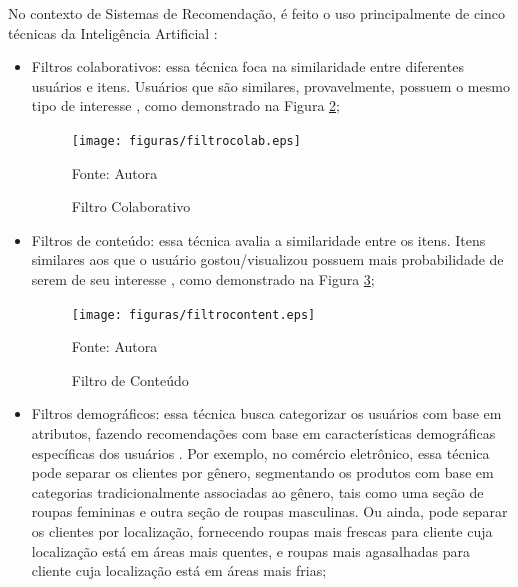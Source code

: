 No contexto de Sistemas de Recomendação, é feito o uso principalmente de cinco técnicas da Inteligência Artificial 
\cite{stratoflow-recommendation}:
\begin{itemize}
\item Filtros colaborativos: essa técnica foca na similaridade entre diferentes usuários e itens. Usuários que são
similares, provavelmente, possuem o mesmo tipo de interesse \cite{pham2019recommendation}, como demonstrado na Figura 
\hyperref[fig:filtrocolab]{2};

\begin{figure}[htbp]
    \centering
    \caption{Filtro Colaborativo}
    \label{fig:filtrocolab}
    
    \vspace{2pt} %
    
    \texttt{[image: figuras/filtrocolab.eps]}
    
    \vspace{2pt} %
    
    \small Fonte: Autora
\end{figure}

\item Filtros de conteúdo: essa técnica avalia a similaridade entre os itens. Itens similares aos que o usuário gostou/visualizou
possuem mais probabilidade de serem de seu interesse \cite{stratoflow-recommendation}, 
como demonstrado na Figura 
\hyperref[fig:filtrocont]{3};

\begin{figure}[htbp]
    \centering
    \caption{Filtro de Conteúdo}
    \label{fig:filtrocont}
    
    \vspace{2pt} %
    
    \texttt{[image: figuras/filtrocontent.eps]}
    
    \vspace{2pt} %
    
    \small Fonte: Autora
\end{figure}

\item Filtros demográficos: essa técnica busca categorizar os usuários com base em atributos, fazendo recomendações
com base em características demográficas específicas dos usuários \cite{burke2002hybrid}. Por exemplo, no comércio eletrônico, 
essa técnica pode separar os clientes por gênero, segmentando os produtos com base em categorias 
tradicionalmente associadas ao gênero, tais como uma seção de roupas femininas e outra seção de roupas masculinas. Ou ainda,
pode separar os clientes por localização, fornecendo roupas mais frescas para cliente cuja localização está em áreas mais quentes,
e roupas mais agasalhadas para cliente cuja localização está em áreas mais frias;


\end{itemize}
